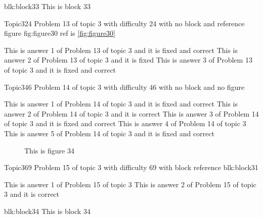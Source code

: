 \documentclass[master]{exam}
\begin{document}
\begin{block}{blk:block33}
This is block 33
\end{block}


\begin{problem}{Topic3}{24}
	Problem 13 of topic 3 with difficulty 24 with no block and reference figure fig:figure30 ref is \ref{fig:figure30}
	\begin{answers}
		 This is answer 1 of Problem 13 of topic 3 and it is fixed and correct
		\answer[fixed] This is answer 2 of Problem 13 of topic 3 and it is fixed
		 This is answer 3 of Problem 13 of topic 3 and it is fixed and correct
	\end{answers}
\end{problem}

\begin{problem}{Topic3}{46}
	Problem 14 of topic 3 with difficulty 46 with no block and no figure
	\begin{answers}
		 This is answer 1 of Problem 14 of topic 3 and it is fixed and correct
		\answer[correct] This is answer 2 of Problem 14 of topic 3 and it is correct
		 This is answer 3 of Problem 14 of topic 3 and it is fixed and correct
		\answer This is answer 4 of Problem 14 of topic 3 
		 This is answer 5 of Problem 14 of topic 3 and it is fixed and correct
	\end{answers}
\end{problem}



\begin{figure}
	\begin{center}
		This is figure 34 
		\label{fig:figure34}
	\end{center}
\end{figure}

\begin{problem}[requires=blk:block31]{Topic3}{69}
	Problem 15 of topic 3 with difficulty 69 with block reference blk:block31
	\begin{answers}
		\answer This is answer 1 of Problem 15 of topic 3 
		\answer[correct] This is answer 2 of Problem 15 of topic 3 and it is correct
	\end{answers}
\end{problem}



\begin{block}{blk:block34}
This is block 34
\end{block}
\end{document}
